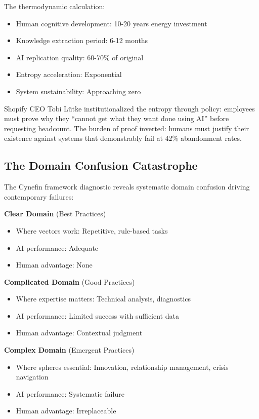 The thermodynamic calculation:
\begin{itemize}
\item Human cognitive development: 10-20 years energy investment
\item Knowledge extraction period: 6-12 months
\item AI replication quality: 60-70\% of original
\item Entropy acceleration: Exponential
\item System sustainability: Approaching zero
\end{itemize}

Shopify CEO Tobi Lütke institutionalized the entropy through policy: employees must prove why they ``cannot get what they want done using AI'' before requesting headcount. The burden of proof inverted: humans must justify their existence against systems that demonstrably fail at 42\% abandonment rates.

\subsection{The Domain Confusion Catastrophe}

The Cynefin framework diagnostic reveals systematic domain confusion driving contemporary failures:

\textbf{Clear Domain} (Best Practices)
\begin{itemize}
\item Where vectors work: Repetitive, rule-based tasks
\item AI performance: Adequate
\item Human advantage: None
\end{itemize}

\textbf{Complicated Domain} (Good Practices)
\begin{itemize}
\item Where expertise matters: Technical analysis, diagnostics
\item AI performance: Limited success with sufficient data
\item Human advantage: Contextual judgment
\end{itemize}

\textbf{Complex Domain} (Emergent Practices)
\begin{itemize}
\item Where spheres essential: Innovation, relationship management, crisis navigation
\item AI performance: Systematic failure
\item Human advantage: Irreplaceable
\end{itemize}

